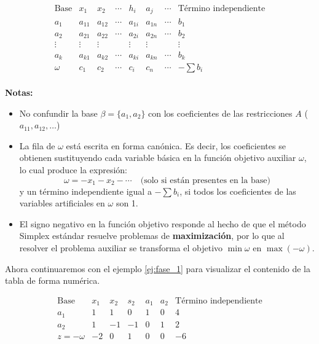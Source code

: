\[
\begin{array}{c|cccccc|c}
\text{Base} & x_1 & x_2 & \cdots & h_i & a_j & \cdots & \text{Término independiente} \\
\hline
a_1 & a_{11} & a_{12} & \cdots & a_{1i} & a_{1n} & \cdots & b_1 \\
a_2 & a_{21} & a_{22} & \cdots & a_{2i} & a_{2n} & \cdots & b_2 \\
\vdots & \vdots & \vdots & & \vdots & \vdots & & \vdots \\
a_k & a_{k1} & a_{k2} & \cdots & a_{ki} & a_{kn} & \cdots & b_k \\
\hline
\omega & c_1 & c_2 & \cdots & c_i & c_n & \cdots & -\sum b_i \\
\end{array}
\]

\textbf{Notas:}
\begin{itemize}
  \item No confundir la base \(\beta=\{a_1,a_2\}\) con los coeficientes de las restricciones \(A\) (\(a_{11},a_{12},\dots\)) 
  \item La fila de \(\omega\) está escrita en forma canónica. Es decir, los coeficientes se obtienen sustituyendo cada variable básica en la función objetivo auxiliar \(\omega\), lo cual produce la expresión: 
  \[
  \omega = -x_1 - x_2 - \cdots \quad \text{(solo si están presentes en la base)}
  \]
  y un término independiente igual a \( -\sum b_i \), si todos los coeficientes de las variables artificiales en \(\omega\) son 1.
  \item El signo negativo en la función objetivo responde al hecho de que el método Simplex estándar resuelve problemas de \textbf{maximización}, por lo que al resolver el problema auxiliar se transforma el objetivo \( \min \omega \) en \( \max (-\omega) \).
\end{itemize}

\begin{tcolorbox}[myconclusion]
  Ahora continuaremos con el ejemplo \ref{ej:fase_1} para visualizar el contenido de la tabla de forma numérica.
\end{tcolorbox}

\[
\begin{array}{c|rrrrr|r}
\text{Base} & x_1 & x_2 & s_2 & a_1 & a_2 & \text{Término independiente} \\
\hline
a_1 & 1 & 1 & 0 & 1 & 0 & 4 \\
a_2 & 1 & -1 & -1 & 0 & 1 & 2 \\
\hline
z = -\omega & -2 & 0 & 1 & 0 & 0 & -6 \\
\end{array}
\]


